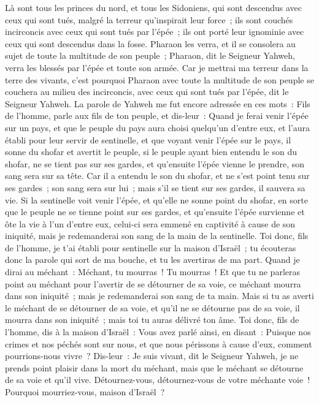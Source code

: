 \begin{multicols}{2}
Là sont tous les princes du nord, et tous les Sidoniens, qui sont descendus avec ceux qui sont tués, malgré la terreur qu'inspirait leur force~; ils sont couchés incirconcis avec ceux qui sont tués par l'épée~; ils ont porté leur ignominie avec ceux qui sont descendus dans la fosse.
Pharaon les verra, et il se consolera au sujet de toute la multitude de son peuple~; Pharaon, dit le Seigneur Yahweh, verra les blessés par l'épée et toute son armée.
Car je mettrai ma terreur dans la terre des vivants, c'est pourquoi Pharaon avec toute la multitude de son peuple se couchera au milieu des incirconcis, avec ceux qui sont tués par l'épée, dit le Seigneur Yahweh.
\VerseOne{}La parole de Yahweh me fut encore adressée en ces mots~:
Fils de l'homme, parle aux fils de ton peuple, et dis-leur~: Quand je ferai venir l'épée sur un pays, et que le peuple du pays aura choisi quelqu'un d'entre eux, et l'aura établi pour leur servir de sentinelle,
et que voyant venir l'épée sur le pays, il sonne du shofar et avertit le peuple,
si le peuple ayant bien entendu le son du shofar, ne se tient pas sur ses gardes, et qu'ensuite l'épée vienne le prendre, son sang sera sur sa tête.
Car il a entendu le son du shofar, et ne s'est point tenu sur ses gardes~; son sang sera sur lui~; mais s'il se tient sur ses gardes, il sauvera sa vie.
Si la sentinelle voit venir l'épée, et qu'elle ne sonne point du shofar, en sorte que le peuple ne se tienne point sur ses gardes, et qu'ensuite l'épée survienne et ôte la vie à l'un d'entre eux, celui-ci sera emmené en captivité à cause de son iniquité, mais je redemanderai son sang de la main de la sentinelle.
Toi donc, fils de l'homme, je t'ai établi pour sentinelle sur la maison d'Israël~; tu écouteras donc la parole qui sort de ma bouche, et tu les avertiras de ma part.
Quand je dirai au méchant~: Méchant, tu mourras~! Tu mourras~! Et que tu ne parleras point au méchant pour l'avertir de se détourner de sa voie, ce méchant mourra dans son iniquité~; mais je redemanderai son sang de ta main.
Mais si tu as averti le méchant de se détourner de sa voie, et qu'il ne se détourne pas de sa voie, il mourra dans son iniquité~; mais toi tu auras délivré ton âme.
Toi donc, fils de l'homme, dis à la maison d'Israël~: Vous avez parlé ainsi, en disant~: Puisque nos crimes et nos péchés sont sur nous, et que nous périssons à cause d'eux, comment pourrions-nous vivre~?
Dis-leur~: Je suis vivant, dit le Seigneur Yahweh, je ne prends point plaisir dans la mort du méchant, mais que le méchant se détourne de sa voie et qu'il vive. Détournez-vous, détournez-vous de votre méchante voie~! Pourquoi mourriez-vous, maison d'Israël~?

\end{multicols}
